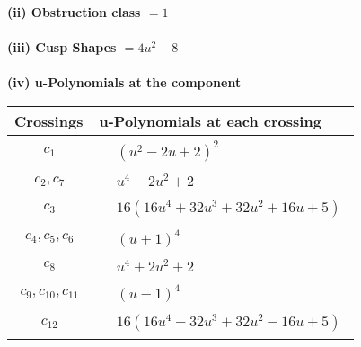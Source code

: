 \documentclass[1p]{elsarticle_modified}
\theoremstyle{definition}
\begin{document}
\flushleft \textbf{(ii) Obstruction class $= 1$}\\~\\
\flushleft \textbf{(iii) Cusp Shapes $= 4 u^2-8$}\\~\\
\newpage\renewcommand{\arraystretch}{1}
\flushleft \textbf{(iv) u-Polynomials at the component}\newline \\
\begin{tabular}{m{50pt}|m{274pt}}
Crossings & \hspace{64pt}u-Polynomials at each crossing \\
\hline $$\begin{aligned}c_{1}\end{aligned}$$&$\begin{aligned}
&(u^2-2 u+2)^2
\end{aligned}$\\
\hline $$\begin{aligned}c_{2},c_{7}\end{aligned}$$&$\begin{aligned}
&u^4-2 u^2+2
\end{aligned}$\\
\hline $$\begin{aligned}c_{3}\end{aligned}$$&$\begin{aligned}
&16(16 u^4+32 u^3+32 u^2+16 u+5)
\end{aligned}$\\
\hline $$\begin{aligned}c_{4},c_{5},c_{6}\end{aligned}$$&$\begin{aligned}
&(u+1)^4
\end{aligned}$\\
\hline $$\begin{aligned}c_{8}\end{aligned}$$&$\begin{aligned}
&u^4+2 u^2+2
\end{aligned}$\\
\hline $$\begin{aligned}c_{9},c_{10},c_{11}\end{aligned}$$&$\begin{aligned}
&(u-1)^4
\end{aligned}$\\
\hline $$\begin{aligned}c_{12}\end{aligned}$$&$\begin{aligned}
&16(16 u^4-32 u^3+32 u^2-16 u+5)
\end{aligned}$\\
\hline
\end{tabular}\\~\\
\end{document}
